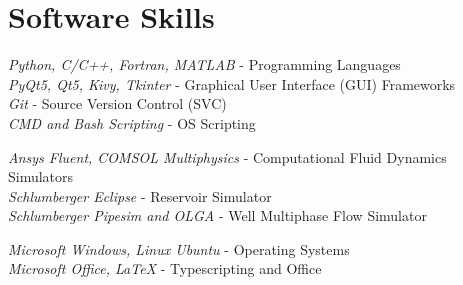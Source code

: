 \documentclass[10pt]{article} %
\begin{document}



\section{Software Skills}

{
\textit{Python, C/C++, Fortran, MATLAB} - Programming Languages\\
\textit{PyQt5, Qt5, Kivy, Tkinter} - Graphical User Interface (GUI) Frameworks\\
\textit{Git} - Source Version Control (SVC)\\
\textit{CMD and Bash Scripting} - OS Scripting
}


{
\textit{Ansys Fluent, COMSOL Multiphysics} - Computational Fluid Dynamics Simulators\\
\textit{Schlumberger Eclipse} - Reservoir Simulator\\
\textit{Schlumberger Pipesim and OLGA} - Well Multiphase Flow Simulator
}


{
\textit{Microsoft Windows, Linux Ubuntu} - Operating Systems\\
\textit{Microsoft Office, \LaTeX} - Typescripting and Office
}

\end{document}
